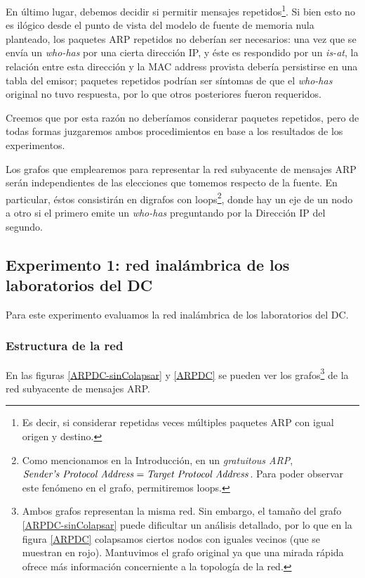 \par En último lugar, debemos decidir si permitir mensajes repetidos\footnote{Es decir, si considerar repetidas veces múltiples paquetes ARP con igual origen y destino.}. 
Si bien esto no es ilógico desde el punto de vista del modelo de fuente de memoria nula planteado, los paquetes ARP repetidos no deberían ser necesarios: una vez que se envía un \textit{who-has} por una cierta dirección IP, y éste es respondido por un \textit{is-at}, la relación entre esta dirección y la MAC address provista debería persistirse en una tabla del emisor; paquetes repetidos podrían ser síntomas de que el \textit{who-has} original no tuvo respuesta, por lo que otros posteriores fueron requeridos.

\par Creemos que por esta razón no deberíamos considerar paquetes repetidos, pero de todas formas juzgaremos ambos procedimientos en base a los resultados de los experimentos.

\par Los grafos que emplearemos para representar la red subyacente de mensajes ARP serán independientes de las elecciones que tomemos respecto de la fuente.
En particular, éstos consistirán en digrafos con loops\footnote{Como mencionamos en la Introducción, en un \textit{gratuitous ARP}, $\text{\textit{Sender's Protocol Address}} = \text{\textit{Target Protocol Address}}$. Para poder observar este fenómeno en el grafo, permitiremos loops.}, donde hay un eje de un nodo a otro si el primero emite un \textit{who-has} preguntando por la Dirección IP del segundo. 

\subsection{Experimento 1: red inalámbrica de los laboratorios del DC}

\par Para este experimento evaluamos la red inalámbrica de los laboratorios del DC.

\subsubsection{Estructura de la red}

\par En las figuras \ref{ARPDC-sinColapsar} y \ref{ARPDC} se pueden ver los grafos\footnote{Ambos grafos representan la misma red. Sin embargo, el tamaño del grafo \ref{ARPDC-sinColapsar} puede dificultar un análisis detallado, por lo que en la figura \ref{ARPDC} colapsamos ciertos nodos con iguales vecinos (que se muestran en rojo). Mantuvimos el grafo original ya que una mirada rápida ofrece más información concerniente a la topología de la red.} de la red subyacente de mensajes ARP.

